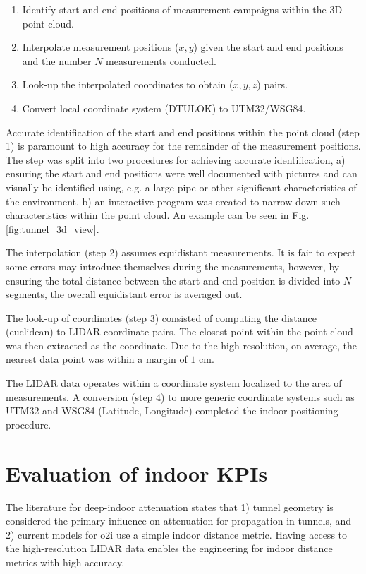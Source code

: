 \begin{enumerate}
    \item Identify start and end positions of measurement campaigns within the $3$D point cloud.
    \item Interpolate measurement positions ($x, y$) given the start and end positions and the number $N$ measurements conducted.
    \item Look-up the interpolated coordinates to obtain ($x, y, z$) pairs.
    \item Convert local coordinate system (DTULOK) to UTM32/WSG84.
\end{enumerate}

Accurate identification of the start and end positions within the point cloud (step 1) is paramount to high accuracy for the remainder of the measurement positions. The step was split into two procedures for achieving accurate identification, a) ensuring the start and end positions were well documented with pictures and can visually be identified using, e.g. a large pipe or other significant characteristics of the environment. b) an interactive program was created to narrow down such characteristics within the point cloud. An example can be seen in Fig. \ref{fig:tunnel_3d_view}. 

The interpolation (step 2) assumes equidistant measurements. It is fair to expect some errors may introduce themselves during the measurements, however, by ensuring the total distance between the start and end position is divided into $N$ segments, the overall equidistant error is averaged out.

The look-up of coordinates (step 3) consisted of computing the distance (euclidean) to LIDAR coordinate pairs. The closest point within the point cloud was then extracted as the coordinate. Due to the high resolution, on average, the nearest data point was within a margin of $1$ cm.

The LIDAR data operates within a coordinate system localized to the area of measurements. A conversion (step 4)  to more generic coordinate systems such as UTM32 and WSG84 (Latitude, Longitude) \cite{alan_d_snow_2020_3714221} completed the indoor positioning procedure. 


\section{Evaluation of indoor KPIs}
The literature for deep-indoor attenuation states that 1) tunnel geometry is considered the primary influence on attenuation for propagation in tunnels, and 2) current models for \gls{o2i} use a simple indoor distance metric. Having access to the high-resolution LIDAR data enables the engineering for indoor distance metrics with high accuracy. 


